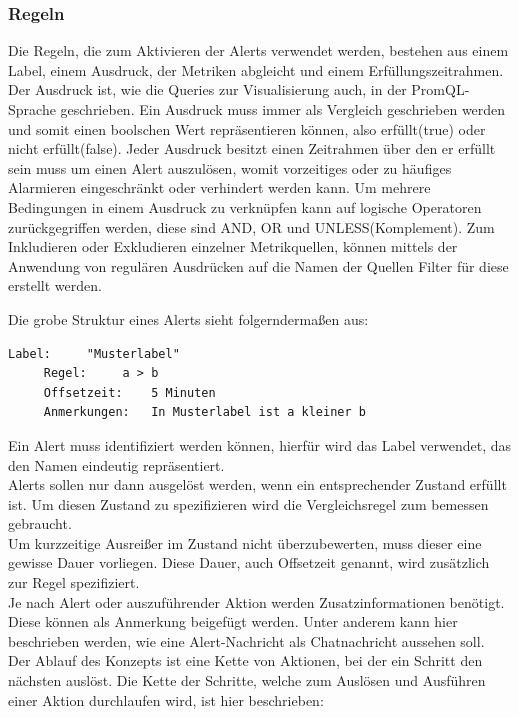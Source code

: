 \documentclass[a4paper,10pt]{scrartcl}
\begin{document}
\subsubsection{Regeln}

Die Regeln, die zum Aktivieren der Alerts verwendet werden, bestehen aus einem Label, einem Ausdruck, der Metriken abgleicht und einem Erfüllungszeitrahmen.
Der Ausdruck ist, wie die Queries zur Visualisierung auch, in der PromQL-Sprache geschrieben. Ein Ausdruck muss immer als Vergleich geschrieben werden und somit einen boolschen Wert repräsentieren können, also erfüllt(true) oder nicht erfüllt(false).
Jeder Ausdruck besitzt einen Zeitrahmen über den er erfüllt sein muss um einen Alert auszulösen, womit vorzeitiges oder zu häufiges Alarmieren eingeschränkt oder verhindert werden kann.
Um mehrere Bedingungen in einem Ausdruck zu verknüpfen kann auf logische Operatoren zurückgegriffen werden, diese sind AND, OR und UNLESS(Komplement).
Zum Inkludieren oder Exkludieren einzelner Metrikquellen, können mittels der Anwendung von regulären Ausdrücken auf die Namen der Quellen Filter für diese erstellt werden.

Die grobe Struktur eines Alerts sieht folgerndermaßen aus:\\

\begin{lstlisting}[basicstyle=\footnotesize]
     Label:		"Musterlabel"
     Regel:		a > b
     Offsetzeit:	5 Minuten
     Anmerkungen:	In Musterlabel ist a kleiner b
\end{lstlisting}

Ein Alert muss identifiziert werden können, hierfür wird das Label verwendet, das den Namen eindeutig repräsentiert.\\
Alerts sollen nur dann ausgelöst werden, wenn ein entsprechender Zustand erfüllt ist. Um diesen Zustand zu spezifizieren wird die Vergleichsregel zum bemessen gebraucht.\\
Um kurzzeitige Ausreißer im Zustand nicht überzubewerten, muss dieser eine gewisse Dauer vorliegen. Diese Dauer, auch Offsetzeit genannt, wird zusätzlich zur Regel spezifiziert.\\
Je nach Alert oder auszuführender Aktion werden Zusatzinformationen benötigt. Diese können als Anmerkung beigefügt werden. Unter anderem kann hier beschrieben werden, wie eine Alert-Nachricht als Chatnachricht aussehen soll.\\

Der Ablauf des Konzepts ist eine Kette von Aktionen, bei der ein Schritt den nächsten auslöst. Die Kette der Schritte, welche zum Auslösen und Ausführen einer Aktion durchlaufen wird, ist hier beschrieben:\\
\end{document}
